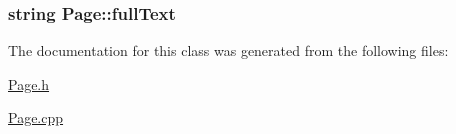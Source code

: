 \subsubsection[{full\+Text}]{\setlength{\rightskip}{0pt plus 5cm}string Page\+::full\+Text}\label{class_page_a8713192624b3bc969533e4ebd39516c3}


The documentation for this class was generated from the following files\+:\begin{DoxyCompactItemize}
\item 
\hyperlink{_page_8h}{Page.\+h}\item 
\hyperlink{_page_8cpp}{Page.\+cpp}\end{DoxyCompactItemize}
